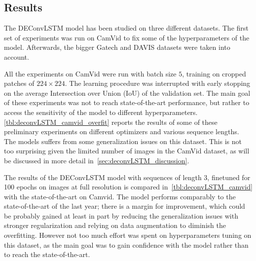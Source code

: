 \subsection{Results}\label{sec:deconvLSTM_results}

The DEConvLSTM model has been studied on three different datasets. The first
set of experiments was run on CamVid to fix some of the hyperparameters of the
model. Afterwards, the bigger Gatech and DAVIS datasets were taken into
account.

All the experiments on CamVid were run with batch size $5$, training on cropped
patches of $224 \times 224$. The learning procedure was interrupted with early
stopping on the average Intersection over Union (IoU) of the validation set.
The main goal of these experiments was not to reach state-of-the-art
performance, but rather to access the sensitivity of the model to different
hyperparameters. \autoref{tbl:deconvLSTM_camvid_overfit} reports the results of
some of these preliminary experiments on different optimizers and various
sequence lengths. The models suffers from some generalization issues on this
dataset. This is not too surprising given the limited number of images in the
CamVid dataset, as will be discussed in more detail
in~\autoref{sec:deconvLSTM_discussion}.

The results of the DEConvLSTM model with sequences of length $3$, finetuned for
100 epochs on images at full resolution is compared
in~\autoref{tbl:deconvLSTM_camvid} with the state-of-the-art on Camvid. The
model performs comparably to the state-of-the-art of the last year; there is a
margin for improvement, which could be probably gained at least in part by
reducing the generalization issues with stronger regularization and relying on
data augmentation to diminish the overfitting. However not too much effort was
spent on hyperparameters tuning on this dataset, as the main goal was to gain
confidence with the model rather than to reach the state-of-the-art.

\begin{table}[t]
    \caption{Results on the CamVid dataset. Pixel accuracy and average
        Intersection over Union (IoU) are reported. Higher is better.}
    \label{tbl:deconvLSTM_camvid}
\end{table}

